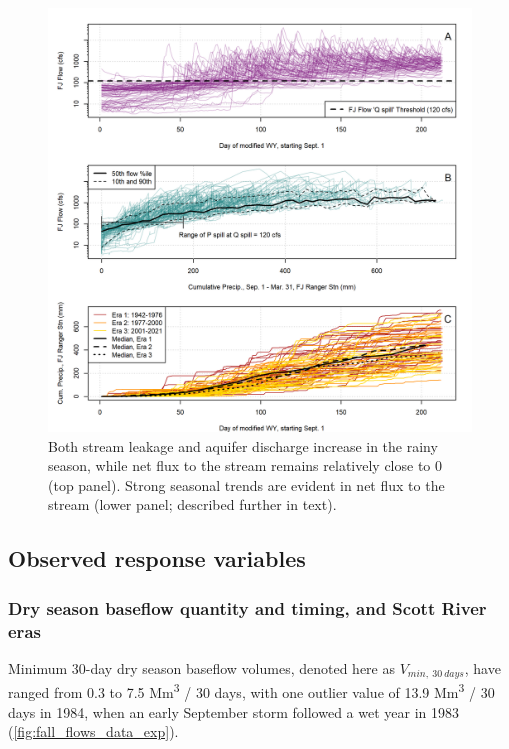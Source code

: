 \documentclass[hess, manuscript]{copernicus}
\begin{document}
\begin{figure}
\includegraphics[width=1\linewidth]{f05} \caption{\label{fig:flow_to_aq_and_stream} Both stream leakage and aquifer discharge increase in the rainy season, while net flux to the stream remains relatively close to 0 (top panel). Strong seasonal trends are evident in net flux to the stream (lower panel; described further in text).}\label{fig:flow_to_aq_and_stream}
\end{figure}

\subsection{Observed response variables}

\subsubsection{Dry season baseflow quantity and timing, and Scott River
eras}

Minimum 30-day dry season baseflow volumes, denoted here as
\(V_{min, ~30~days}\), have ranged from 0.3 to 7.5 Mm\textsuperscript{3}
/ 30 days, with one outlier value of 13.9 Mm\textsuperscript{3} / 30
days in 1984, when an early September storm followed a wet year in 1983
(\autoref{fig:fall_flows_data_exp}).
\end{document}

